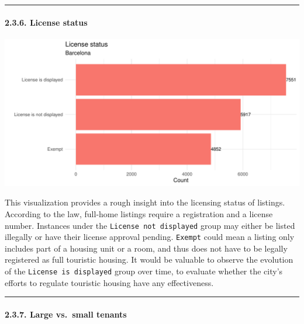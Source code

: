 \documentclass[
]{article}
\begin{document}
\begin{center}\rule{0.5\linewidth}{0.5pt}\end{center}

\hypertarget{license-status-1}{%
\paragraph{2.3.6. License status}\label{license-status-1}}

\begin{center}\includegraphics{Barcelona-AirBnB-Insights_files/figure-latex/plot6-1} \end{center}

This visualization provides a rough insight into the licensing status of
listings. According to the law, full-home listings require a
registration and a license number. Instances under the
\texttt{License\ not\ displayed} group may either be listed illegally or
have their license approval pending. \texttt{Exempt} could mean a
listing only includes part of a housing unit or a room, and thus does
not have to be legally registered as full touristic housing. It would be
valuable to observe the evolution of the \texttt{License\ is\ displayed}
group over time, to evaluate whether the city's efforts to regulate
touristic housing have any effectiveness.

\begin{center}\rule{0.5\linewidth}{0.5pt}\end{center}

\hypertarget{large-vs.-small-tenants}{%
\paragraph{2.3.7. Large vs.~small
tenants}\label{large-vs.-small-tenants}}
\end{document}
